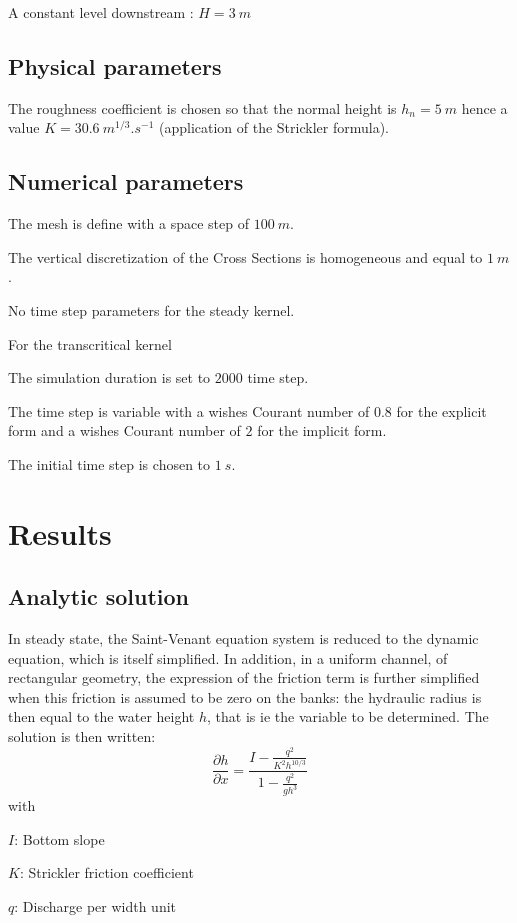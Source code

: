 A constant level downstream : $ H = 3\ m $


\subsection{Physical parameters}

The roughness coefficient is chosen so that the normal height is $ h_n = 5\ m $ hence a value $ K = 30.6\ m^{1/3}.s^{-1} $ (application of the Strickler formula).

\subsection{Numerical parameters}

The mesh is define with a space step of $ 100\ m $.

The vertical discretization of the Cross Sections is homogeneous and equal to $ 1\ m $.

No time step parameters for the steady kernel.

For the transcritical kernel

The simulation duration is set to $ 2000 $ time step.

The time step is variable with a wishes Courant number of $ 0.8 $ for the explicit form and a wishes Courant number of $ 2 $ for the implicit form.

The initial time step is chosen to $ 1\ s $.

\section{Results}

\subsection{Analytic solution}

In steady state, the Saint-Venant equation system is reduced to the dynamic equation, which is itself simplified. In addition, in a uniform channel, of rectangular geometry, the expression of the friction term is further simplified when this friction is assumed to be zero on the banks: the hydraulic radius is then equal to the water height $ h $, that is ie the variable to be determined. The solution is then written:
\begin{equation}
 \frac{\partial h}{\partial x}=\frac{I-\displaystyle \frac{q^2}{K^2h^{10/3}}}{1-\displaystyle \frac{q^2}{gh^3}}
\end{equation}
with
\begin{description}
\item $ I $: Bottom slope
\item $ K $: Strickler friction coefficient
\item $ q $: Discharge per width unit
\end{description}

